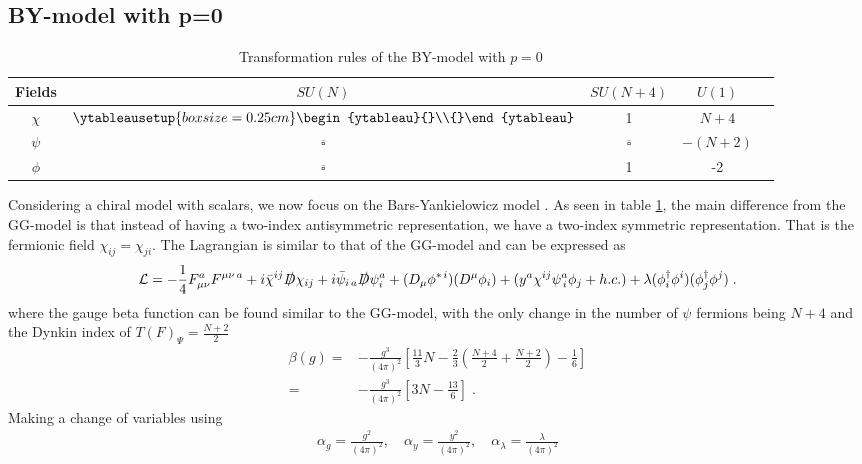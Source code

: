 \subsection{BY-model with p=0}
\begin{table}[h] 
    \centering 
    \begin{tabular}{|c|c|c|c|c|} \hline Fields & $SU(N)$ & $SU(N+4)$  & $U(1)$ \\ \hline $\chi$ & $\ytableausetup{boxsize=0.25cm}\begin{ytableau}{}\\{}\end{ytableau}$ & 1 & $N+4$ \\ $\psi$ & $\overline\square$ & $\overline\square$ & $-(N+2)$ \\ \hline $\phi$ & $\overline\square$ & 1  & -2 \\ \hline 
    \end{tabular} 
    \caption{ Transformation rules of the BY-model with $p=0$} 
    \label{tab:BYp0} 
\end{table}
Considering a chiral model with scalars, we now focus on the Bars-Yankielowicz model \cite{Bars1981BY}. As seen in table \ref{tab:BYp0}, the main difference from the GG-model is that instead of having a two-index antisymmetric representation, we have a two-index symmetric representation. That is the fermionic field $\chi_{ij}=\chi_{ji}$. The Lagrangian is similar to that of the GG-model and can be expressed as
 \begin{align*}\mathcal{L}= -\frac{1}{4} F_{\mu\nu}^a F^{\mu\nu\,a}+i \bar \chi^{ij}\slashed{D}\chi_{ij}+i \bar \psi_{i\,a}\slashed{D}\psi_i^a+(D_\mu \phi^{*\,i})(D^\mu\phi_i)+(y^a\chi^{ij} \psi ^a_{\, i} \phi_j + h.c.)+\lambda (\phi^{\dagger}_i \phi^i)( \phi^{\dagger}_j \phi^j )
    \;.
 \end{align*}
 where the gauge beta function can be found similar to the GG-model, with the only change in the number of $\psi$ fermions being $N+4$ and the Dynkin index of $T(F)_\Psi=\frac{N+2}{2}$
 \begin{align}
    \beta(g)=&-\frac{g^3}{(4\pi)^2}\left[\frac{11}{3}N-\frac{2}{3}\left(\frac{N+4}{2}+\frac{N+2}{2}\right)-\frac{1}{6}\right]
    \\=&-\frac{g^3}{(4\pi)^2}\left[3N-\frac{13}{6}\right]\;.
\end{align}
Making a change of variables using
\begin{align}
    \alpha_g = \frac{g^2}{(4\pi)^2}, \quad \alpha_y = \frac{y^2}{(4\pi)^2}, \quad\alpha_\lambda = \frac{\lambda}{(4\pi)^2}
\end{align}
